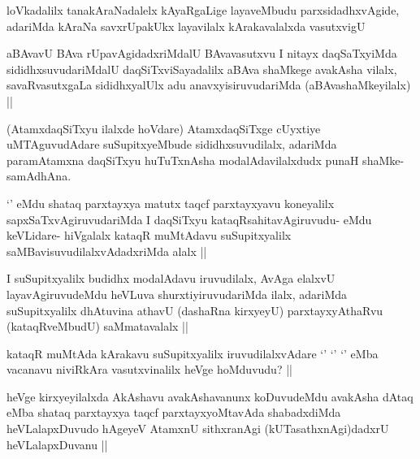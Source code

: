 
\begin{artha}
loVkadalilx tanakAraNadalelx kAyaRgaLige layaveMbudu parxsidadhxvAgide, adariMda kAraNa savxrUpakUkx layavilalx kArakavalalxda vasutxvigU
\end{artha}


\begin{artha}
aBAvavU BAva rUpavAgidadxriMdalU BAvavasutxvu I nitayx daqSaTxyiMda sididhxsuvudariMdalU daqSiTxviSayadalilx aBAva shaMkege avakAsha vilalx, savaRvasutxgaLa sididhxyalUlx adu anavxyisiruvudariMda (aBAvashaMkeyilalx) ||
\end{artha}


\begin{artha}
(AtamxdaqSiTxyu ilalxde hoVdare) AtamxdaqSiTxge cUyxtiye uMTAguvudAdare suSupitxyeMbude sididhxsuvudilalx, adariMda paramAtamxna daqSiTxyu huTuTxnAsha modalAdavilalxdudx punaH shaMke- samAdhAna.
\end{artha}

\begin{artha}
`\stext' eMdu shataq parxtayxya matutx taqcf parxtayxyavu koneyalilx sapxSaTxvAgiruvudariMda I daqSiTxyu kataqRsahitavAgiruvudu- eMdu keVLidare- hiVgalalx kataqR muMtAdavu suSupitxyalilx saMBavisuvudilalxvAdadxriMda alalx ||
\end{artha}

\begin{artha}
I suSupitxyalilx budidhx modalAdavu iruvudilalx, AvAga elalxvU layavAgiruvudeMdu heVLuva shurxtiyiruvudariMda ilalx, adariMda suSupitxyalilx dhAtuvina athavU (dashaRna kirxyeyU) parxtayxyAthaRvu (kataqRveMbudU) saMmatavalalx ||
\end{artha}


\begin{artha}
kataqR muMtAda kArakavu suSupitxyalilx iruvudilalxvAdare `\stext' `\stext' `\stext' eMba vacanavu niviRkAra vasutxvinalilx heVge hoMduvudu? ||
\end{artha}

\begin{artha}
heVge kirxyeyilalxda AkAshavu avakAshavanunx koDuvudeMdu avakAsha dAtaq eMba shataq parxtayxya taqcf parxtayxyoMtavAda shabadxdiMda heVLalapxDuvudo hAgeyeV AtamxnU sithxranAgi (kUTasathxnAgi)dadxrU heVLalapxDuvanu ||
\end{artha}

